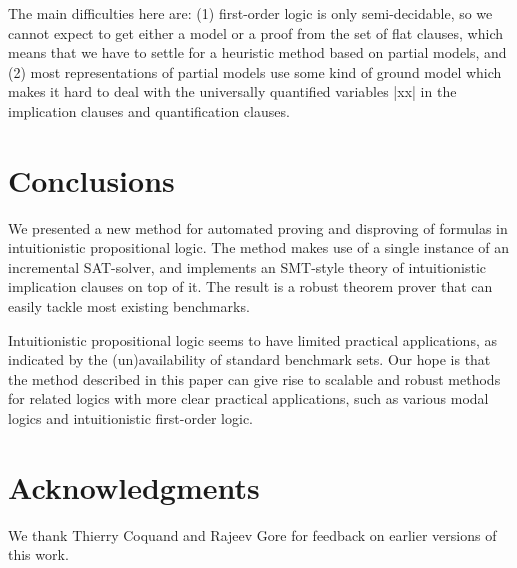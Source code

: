\documentclass{llncs}
\begin{document}
The main difficulties here are: (1) first-order logic is only semi-decidable, so we cannot expect to get either a model or a proof from the set of flat clauses, which means that we have to settle for a heuristic method based on partial models, and (2) most representations of partial models use some kind of ground model which makes it hard to deal with the universally quantified variables |xx| in the implication clauses and quantification clauses.


\section{Conclusions}

We presented a new method for automated proving and disproving of formulas in intuitionistic propositional logic. The method makes use of a single instance of an incremental SAT-solver, and implements an SMT-style theory of intuitionistic implication clauses on top of it. The result is a robust theorem prover that can easily tackle most existing benchmarks.

Intuitionistic propositional logic seems to have limited practical applications, as indicated by the (un)availability of standard benchmark sets. Our hope is that the method described in this paper can give rise to scalable and robust methods for related logics with more clear practical applications, such as various modal logics and intuitionistic first-order logic.


\section*{Acknowledgments}

We thank Thierry Coquand and Rajeev Gore for feedback on earlier versions of
this work.




\end{document}
